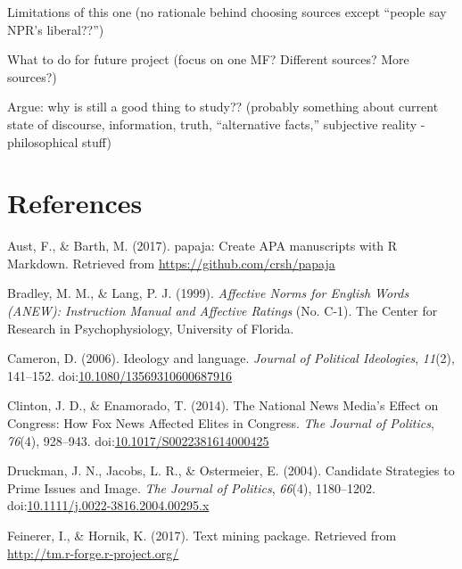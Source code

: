 \documentclass[,man]{apa6}
\begin{document}
Limitations of this one (no rationale behind choosing sources except \enquote{people say NPR's liberal??})

What to do for future project (focus on one MF? Different sources? More sources?)

Argue: why is still a good thing to study?? (probably something about current state of discourse, information, truth, \enquote{alternative facts,} subjective reality - philosophical stuff)

\newpage

\hypertarget{references}{%
\section{References}\label{references}}

\begingroup
\setlength{\parindent}{-0.5in}
\setlength{\leftskip}{0.5in}

\hypertarget{refs}{}
\leavevmode\hypertarget{ref-Aust2017}{}%
Aust, F., \& Barth, M. (2017). papaja: Create APA manuscripts with R Markdown. Retrieved from \url{https://github.com/crsh/papaja}

\leavevmode\hypertarget{ref-Bradley1999}{}%
Bradley, M. M., \& Lang, P. J. (1999). \emph{Affective Norms for English Words (ANEW): Instruction Manual and Affective Ratings} (No. C-1). The Center for Research in Psychophysiology, University of Florida.

\leavevmode\hypertarget{ref-Cameron2006}{}%
Cameron, D. (2006). Ideology and language. \emph{Journal of Political Ideologies}, \emph{11}(2), 141--152. doi:\href{https://doi.org/10.1080/13569310600687916}{10.1080/13569310600687916}

\leavevmode\hypertarget{ref-Clinton2014}{}%
Clinton, J. D., \& Enamorado, T. (2014). The National News Media's Effect on Congress: How Fox News Affected Elites in Congress. \emph{The Journal of Politics}, \emph{76}(4), 928--943. doi:\href{https://doi.org/10.1017/S0022381614000425}{10.1017/S0022381614000425}

\leavevmode\hypertarget{ref-Druckman2004}{}%
Druckman, J. N., Jacobs, L. R., \& Ostermeier, E. (2004). Candidate Strategies to Prime Issues and Image. \emph{The Journal of Politics}, \emph{66}(4), 1180--1202. doi:\href{https://doi.org/10.1111/j.0022-3816.2004.00295.x}{10.1111/j.0022-3816.2004.00295.x}

\leavevmode\hypertarget{ref-Feinerer2017}{}%
Feinerer, I., \& Hornik, K. (2017). Text mining package. Retrieved from \url{http://tm.r-forge.r-project.org/}
\end{document}
